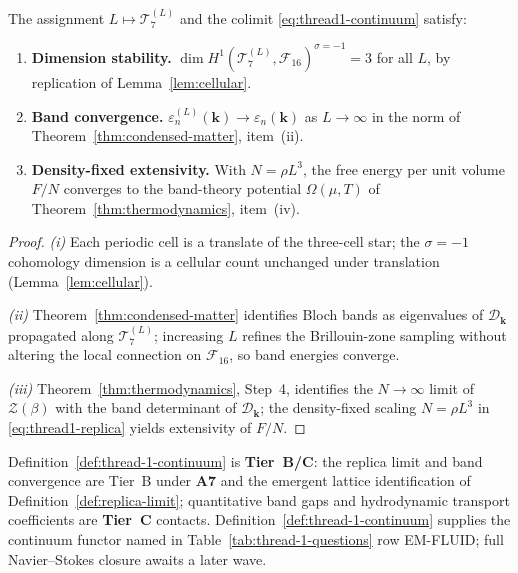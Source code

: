 \begin{proposition}
\label{prop:thread1-continuum-functor}
The assignment $L\mapsto\mathcal{T}_7^{(L)}$ and the colimit
\eqref{eq:thread1-continuum} satisfy:
\begin{enumerate}[label=(\roman*),leftmargin=*]
  \item \textbf{Dimension stability.}
    $\dim H^1(\mathcal{T}_7^{(L)},\mathcal{F}_{16})^{\sigma=-1}=3$ for all
    $L$, by replication of Lemma~\ref{lem:cellular}.
  \item \textbf{Band convergence.}
    $\varepsilon_n^{(L)}(\mathbf{k})\to\varepsilon_n(\mathbf{k})$ as
    $L\to\infty$ in the norm of Theorem~\ref{thm:condensed-matter},
    item~(ii).
  \item \textbf{Density-fixed extensivity.}
    With $N=\rho L^3$, the free energy per unit volume
    $F/N$ converges to the band-theory potential
    $\Omega(\mu,T)$ of Theorem~\ref{thm:thermodynamics}, item~(iv).
\end{enumerate}
\end{proposition}

\begin{proof}
\emph{(i)} Each periodic cell is a translate of the three-cell star; the
$\sigma=-1$ cohomology dimension is a cellular count unchanged under
translation (Lemma~\ref{lem:cellular}).

\emph{(ii)} Theorem~\ref{thm:condensed-matter} identifies Bloch bands as
eigenvalues of $\mathcal{D}_{\mathbf{k}}$ propagated along
$\mathcal{T}_7^{(L)}$; increasing $L$ refines the Brillouin-zone sampling
without altering the local connection on $\mathcal{F}_{16}$, so band energies
converge.

\emph{(iii)} Theorem~\ref{thm:thermodynamics}, Step~4, identifies the
$N\to\infty$ limit of $\mathcal{Z}(\beta)$ with the band determinant of
$\mathcal{D}_{\mathbf{k}}$; the density-fixed scaling $N=\rho L^3$ in
\eqref{eq:thread1-replica} yields extensivity of $F/N$.
\end{proof}

\begin{remark}
Definition~\ref{def:thread-1-continuum} is \textbf{Tier~B/C}: the replica
limit and band convergence are Tier~B under \textbf{A7} and the emergent
lattice identification of Definition~\ref{def:replica-limit}; quantitative band
gaps and hydrodynamic transport coefficients are \textbf{Tier~C} contacts.
Definition~\ref{def:thread-1-continuum} supplies the continuum functor named in
Table~\ref{tab:thread-1-questions} row EM-FLUID; full Navier--Stokes closure
awaits a later wave.
\end{remark}

